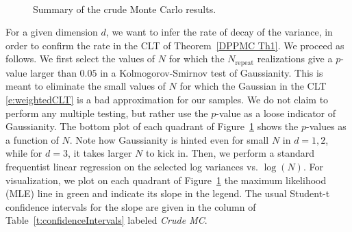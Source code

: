 \documentclass[a4paper,11pt]{article}
\numberwithin{equation}{section}
\theoremstyle{definition}
\newcommand{\rev}[1]{#1}
\def\figdir{.}
\begin{document}
\begin{figure}
\\
\centering
{}
\caption{Summary of the crude Monte Carlo results.}
\label{f:results}
\end{figure}

For a given dimension $d$, we want to infer the rate of decay of the
variance, in order to confirm the rate in the CLT of Theorem~\ref{DPPMC Th1}.
We proceed as follows. We first select the values of $N$ for which the
$N_{\text{repeat}}$ realizations give a $p$-value larger than $0.05$ in a
Kolmogorov-Smirnov test of Gaussianity. This is meant to eliminate the small values of $N$ for which the Gaussian in the CLT \eqref{e:weightedCLT} is a bad approximation for
our samples. We do not claim to perform any multiple testing, but rather use the
$p$-value as a loose indicator of Gaussianity. The bottom plot of each quadrant of
Figure~\ref{f:results} shows the $p$-values as a function of $N$. Note how
Gaussianity is hinted even for small $N$ in $d=1,2$, while for $d=3$, it takes larger $N$ to kick in. \rev{Then, we perform a standard frequentist linear regression} on the selected log variances vs. $\log(N)$. For visualization, we plot on each quadrant of Figure~\ref{f:results} the maximum likelihood (MLE) line in green and indicate its slope in the legend. The usual Student-t confidence intervals for the slope are given in the column of Table~\ref{t:confidenceIntervals} labeled \emph{Crude MC}.
\end{document}
